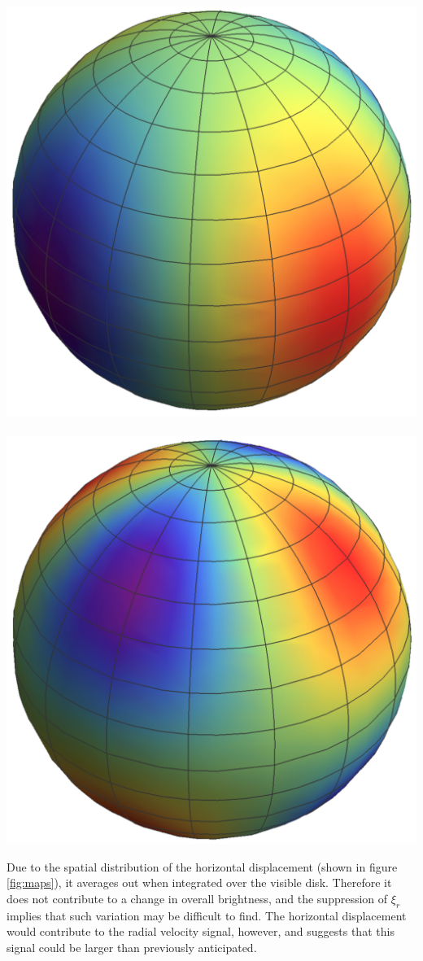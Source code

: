 \documentclass[a0,portrait]{a0poster}
\begin{document}
\begin{multicols}{2}
\begin{tcolorbox}[colframe=black,colback=blue!10!white]
\begin{center}\vspace{1.0cm}
\includegraphics[width=0.45\linewidth]{radial_map_complex_crop_transp}
~
~
~
~
~
~
\includegraphics[width=0.45\linewidth]{tangential_map_complex_crop_transp}
\label{fig:maps}
\end{center}\vspace{1.0cm}


Due to the spatial distribution of the horizontal displacement (shown in figure \ref{fig:maps}), it averages out when integrated over the visible disk. Therefore it does not contribute to a change in overall brightness, and the suppression of $\xi_{r}$ implies that such variation may be difficult to find. The horizontal displacement would contribute to the radial velocity signal, however, and suggests that this signal could be larger than previously anticipated.


\end{tcolorbox}
\end{multicols}
\end{document}
